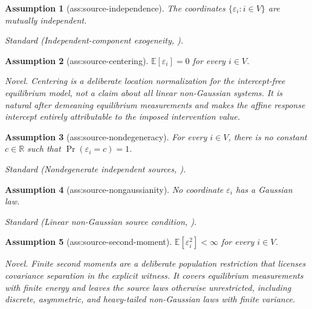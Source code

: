 \documentclass{article}
\newtheorem{assumption}{Assumption}
\begin{document}
\begin{assumption}[ass:source-independence]\label{ass:source-independence}
The coordinates \(\{\varepsilon_i:i\in V\}\) are mutually independent.
\par\smallskip\noindent\emph{Standard} (Independent-component exogeneity, \cite{DaiAlbrechtSpirtesZhang2026}).
\end{assumption}

\begin{assumption}[ass:source-centering]\label{ass:source-centering}
\(\mathbb E[\varepsilon_i]=0\) for every \(i\in V\).
\par\smallskip\noindent\emph{Novel.} Centering is a deliberate location normalization for the intercept-free equilibrium model, not a claim about all linear non-Gaussian systems. It is natural after demeaning equilibrium measurements and makes the affine response intercept entirely attributable to the imposed intervention value.
\end{assumption}

\begin{assumption}[ass:source-nondegeneracy]\label{ass:source-nondegeneracy}
For every \(i\in V\), there is no constant \(c\in\mathbb R\) such that \(\Pr(\varepsilon_i=c)=1\).
\par\smallskip\noindent\emph{Standard} (Nondegenerate independent sources, \cite{DaiAlbrechtSpirtesZhang2026}).
\end{assumption}

\begin{assumption}[ass:source-nongaussianity]\label{ass:source-nongaussianity}
No coordinate \(\varepsilon_i\) has a Gaussian law.
\par\smallskip\noindent\emph{Standard} (Linear non-Gaussian source condition, \cite{DaiAlbrechtSpirtesZhang2026}).
\end{assumption}

\begin{assumption}[ass:source-second-moment]\label{ass:source-second-moment}
\(\mathbb E[\varepsilon_i^2]<\infty\) for every \(i\in V\).
\par\smallskip\noindent\emph{Novel.} Finite second moments are a deliberate population restriction that licenses covariance separation in the explicit witness. It covers equilibrium measurements with finite energy and leaves the source laws otherwise unrestricted, including discrete, asymmetric, and heavy-tailed non-Gaussian laws with finite variance.
\end{assumption}
\end{document}
